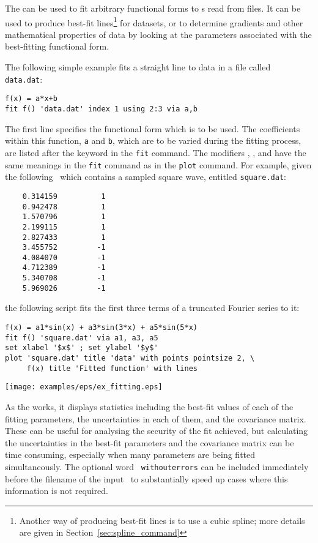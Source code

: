 The  can be used to fit arbitrary functional forms to \datapoint s
read from files. It can be used to produce best-fit lines\footnote{Another way of producing best-fit lines is to use a cubic
spline; more details are given in Section~\ref{sec:spline_command}} for
datasets, or to determine gradients and other mathematical properties of data
by looking at the parameters associated with the best-fitting functional form.

The following simple example fits a straight line to data in a file called {\tt
data.dat}:

\begin{verbatim}
f(x) = a*x+b
fit f() 'data.dat' index 1 using 2:3 via a,b
\end{verbatim}

\noindent The first line specifies the functional form which is to be used.
The coefficients within this function, {\tt a} and {\tt b}, which are to be
varied during the fitting process, are listed after the keyword 
in the {\tt fit} command.  The modifiers , ,
 and  have the same meanings in the {\tt fit}
command as in the {\tt plot} command. For example, given the following
\datafile\ which contains a sampled square wave, entitled {\tt square.dat}:

\begin{verbatim}
    0.314159          1
    0.942478          1
    1.570796          1
    2.199115          1
    2.827433          1
    3.455752         -1
    4.084070         -1
    4.712389         -1
    5.340708         -1
    5.969026         -1
\end{verbatim}

\noindent the following script fits the first three terms of a truncated
Fourier series to it:

\begin{verbatim}
f(x) = a1*sin(x) + a3*sin(3*x) + a5*sin(5*x)
fit f() 'square.dat' via a1, a3, a5
set xlabel '$x$' ; set ylabel '$y$'
plot 'square.dat' title 'data' with points pointsize 2, \
     f(x) title 'Fitted function' with lines
\end{verbatim}

\begin{center}
\texttt{[image: examples/eps/ex\_fitting.eps]}
\end{center}

As the  works, it displays statistics including the best-fit
values of each of the fitting parameters, the uncertainties in each of them,
and the covariance matrix. These can be useful for analysing the security of
the fit achieved, but calculating the uncertainties in the best-fit parameters
and the covariance matrix can be time consuming, especially when many
parameters are being fitted simultaneously. The optional word {\tt
withouterrors} can be included immediately before the filename of the input
\datafile\ to substantially speed up cases where this information is not
required.

